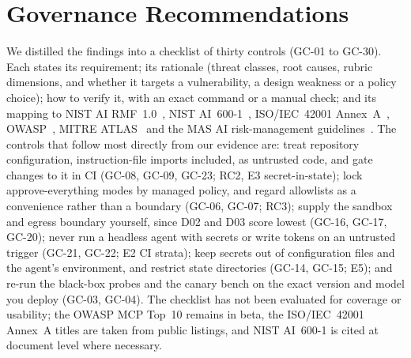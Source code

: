 \section{Governance Recommendations}\label{sec:governance}

We distilled the findings into a checklist of thirty controls (GC-01 to GC-30). Each states its requirement; its rationale (threat classes, root causes, rubric dimensions, and whether it targets a vulnerability, a design weakness or a policy choice); how to verify it, with an exact \tool{} command or a manual check; and its mapping to NIST AI RMF~1.0~\cite{nistairmf}, NIST AI~600-1~\cite{nist600}, ISO/IEC~42001 Annex~A~\cite{iso42001}, OWASP~\cite{owaspllm2025,owaspagentic2026}, MITRE ATLAS~\cite{atlas} and the MAS AI risk-management guidelines~\cite{masairm2026}. The controls that follow most directly from our evidence are: treat repository configuration, instruction-file imports included, as untrusted code, and gate changes to it in CI (GC-08, GC-09, GC-23; RC2, E3 secret-in-state); lock approve-everything modes by managed policy, and regard allowlists as a convenience rather than a boundary (GC-06, GC-07; RC3); supply the sandbox and egress boundary yourself, since D02 and D03 score lowest (GC-16, GC-17, GC-20); never run a headless agent with secrets or write tokens on an untrusted trigger (GC-21, GC-22; E2 CI strata); keep secrets out of configuration files and the agent's environment, and restrict state directories (GC-14, GC-15; E5); and re-run the black-box probes and the canary bench on the exact version and model you deploy (GC-03, GC-04). The checklist has not been evaluated for coverage or usability; the OWASP MCP Top~10 remains in beta, the ISO/IEC~42001 Annex~A titles are taken from public listings, and NIST AI~600-1 is cited at document level where necessary.
